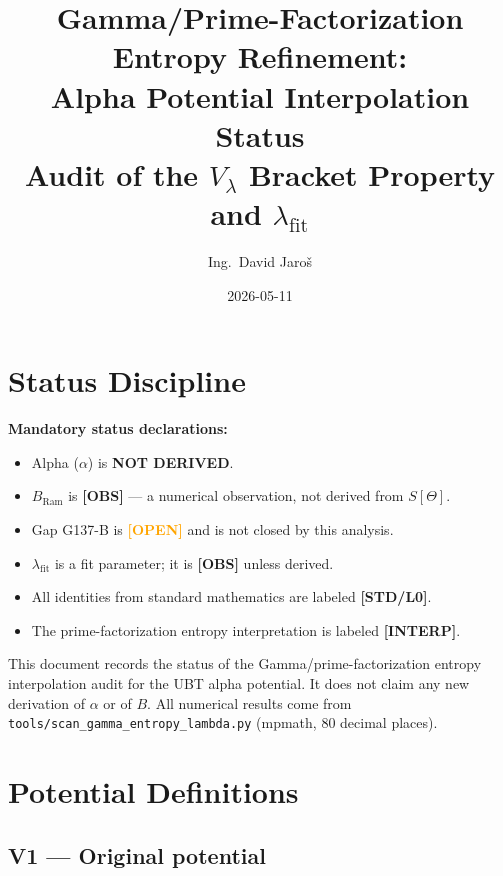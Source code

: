 \documentclass[12pt,a4paper]{article}
\title{\textbf{Gamma/Prime-Factorization Entropy Refinement:\\
         Alpha Potential Interpolation Status}\\
         \large Audit of the $V_\lambda$ Bracket Property and $\lambda_{\mathrm{fit}}$}
\author{Ing.\ David Jaro\v{s}}
\date{2026-05-11}
\theoremstyle{definition}
\theoremstyle{remark}
\newcommand{\STDLZ}{\textcolor{gray!70!black}{\textbf{[STD/L0]}}}
\newcommand{\INTERP}{\textcolor{blue!60!black}{\textbf{[INTERP]}}}
\newcommand{\OBS}{\textcolor{orange!70!black}{\textbf{[OBS]}}}
\newcommand{\OPEN}{\textcolor{orange}{\textbf{[OPEN]}}}
\newcommand{\BRam}{B_{\mathrm{Ram}}}
\begin{document}
  \maketitle
  \tableofcontents
  \newpage
\fi

\section{Status Discipline}
\label{sec:status}

\begin{warnbox}
\textbf{Mandatory status declarations:}
\begin{itemize}
  \item Alpha ($\alpha$) is \textbf{NOT DERIVED}.
  \item $\BRam$ is \OBS{} — a numerical observation, not derived from $S[\Theta]$.
  \item Gap G137-B is \OPEN{} and is not closed by this analysis.
  \item $\lambda_{\mathrm{fit}}$ is a fit parameter; it is \OBS{} unless derived.
  \item All identities from standard mathematics are labeled \STDLZ{}.
  \item The prime-factorization entropy interpretation is labeled \INTERP{}.
\end{itemize}
\end{warnbox}

This document records the status of the Gamma/prime-factorization entropy
interpolation audit for the UBT alpha potential.  It does not claim any new
derivation of $\alpha$ or of $B$.  All numerical results come from
\texttt{tools/scan\_gamma\_entropy\_lambda.py} (mpmath, 80 decimal places).

\section{Potential Definitions}
\label{sec:potentials}

\subsection{V1 — Original potential}
\end{document}

